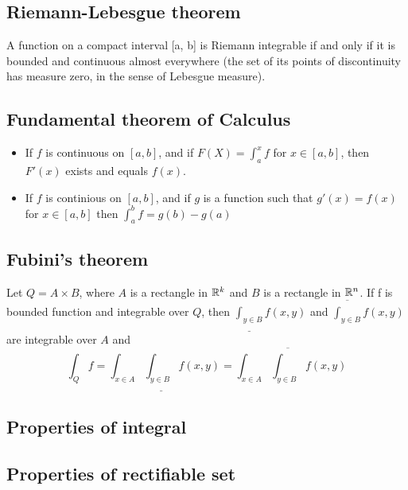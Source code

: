 


\subsection{Riemann-Lebesgue theorem}
A function on a compact interval [a, b] is Riemann integrable if and only if it is bounded and continuous almost everywhere (the set of its points of discontinuity has measure zero, in the sense of Lebesgue measure).


\subsection{Fundamental theorem of Calculus}
\begin{itemize}
\item
	If $f$ is continuous on $[a, b]$, and if $F(X)=\int_a^x f$
	for $x\in[a,b]$, then $F'(x)$ exists and equals $f(x)$.
\item
	If $f$ is continious on $[a, b]$,
	and if $g$ is a function such that
	$g'(x)=f(x)$ for $x\in[a,b]$ then $\int_a^b f = g(b) - g(a)$
\end{itemize}


\subsection{Fubini's theorem}
Let $Q=A\times B$, where $A$ is a rectangle in ${\mathbb R}^k$ and $B$ is a rectangle in ${\mathbb R}^n$.
If f is bounded function and integrable over $Q$, then
$\underline{\int_{y\in B}} f(x,y)$ and $\overline{\int_{y\in B}} f(x,y)$ are integrable over $A$
and
\[\int_Q f = \int_{x\in A}\underline{\int_{y\in B}} f(x,y) = \int_{x\in A}\overline{\int_{y\in B}} f(x,y)\]

\subsection{Properties of integral}
\TODO
\subsection{Properties of rectifiable set}
\TODO

